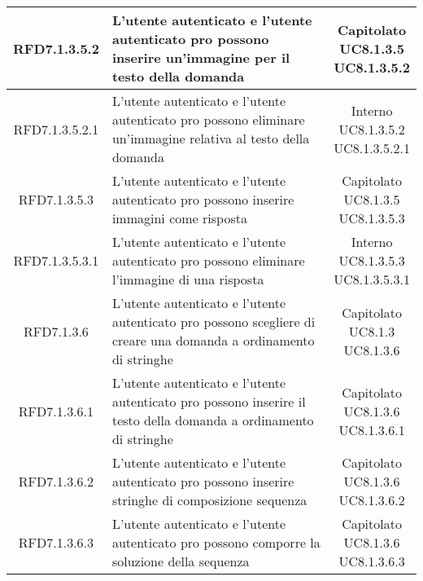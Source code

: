 \begin{longtable}{|c|>{\centering}m{7cm}|c|}
			 \hypertarget{{RFD7.1.3.5.2}}{{RFD7.1.3.5.2}} & L’utente autenticato e l’utente autenticato pro possono inserire un'immagine per il testo della domanda & \makecell{Capitolato\\ UC8.1.3.5 \\UC8.1.3.5.2 } \\ \hline
			 \hypertarget{{RFD7.1.3.5.2.1}}{{RFD7.1.3.5.2.1}} & L’utente autenticato e l’utente autenticato pro possono eliminare un'immagine relativa al testo della domanda  & \makecell{Interno\\ UC8.1.3.5.2 \\UC8.1.3.5.2.1 } \\ \hline
			 \hypertarget{{RFD7.1.3.5.3}}{{RFD7.1.3.5.3}} & L’utente autenticato e l’utente autenticato pro possono inserire immagini come risposta & \makecell{Capitolato\\ UC8.1.3.5 \\UC8.1.3.5.3 } \\ \hline
			 \hypertarget{{RFD7.1.3.5.3.1}}{{RFD7.1.3.5.3.1}} & L’utente autenticato e l’utente autenticato pro possono eliminare l’immagine di una risposta & \makecell{Interno\\ UC8.1.3.5.3 \\UC8.1.3.5.3.1 } \\ \hline
			 \hypertarget{{RFD7.1.3.6}}{{RFD7.1.3.6}} & L’utente autenticato e l’utente autenticato pro possono scegliere di creare una domanda a ordinamento di stringhe & \makecell{Capitolato\\ UC8.1.3 \\UC8.1.3.6 } \\ \hline
			 \hypertarget{{RFD7.1.3.6.1}}{{RFD7.1.3.6.1}} & L’utente autenticato e l’utente autenticato pro possono inserire il testo della domanda a ordinamento di stringhe & \makecell{Capitolato\\ UC8.1.3.6 \\UC8.1.3.6.1 } \\ \hline
			 \hypertarget{{RFD7.1.3.6.2}}{{RFD7.1.3.6.2}} & L’utente autenticato e l’utente autenticato pro possono inserire stringhe di composizione sequenza & \makecell{Capitolato\\ UC8.1.3.6 \\UC8.1.3.6.2 } \\ \hline
			 \hypertarget{{RFD7.1.3.6.3}}{{RFD7.1.3.6.3}} & L’utente autenticato e l’utente autenticato pro possono comporre la soluzione della sequenza & \makecell{Capitolato\\ UC8.1.3.6 \\UC8.1.3.6.3 } \\ \hline

\end{longtable}
